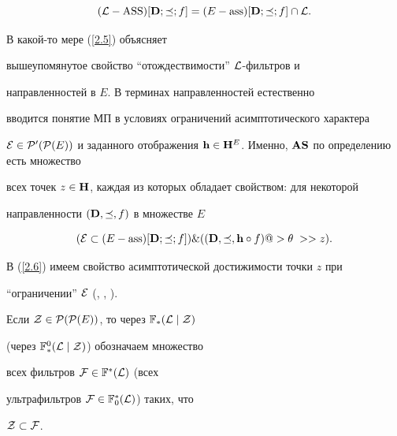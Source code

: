\begin{equation} \label{2.5}


({\cal L}-\ASS)[{\bold D};\preceq;f] = (E-\ass)[{\bold


D};\preceq;f]\cap{\cal L}.


\end{equation}


В какой-то мере (\ref{2.5}) объясняет


вышеупомянутое свойство ``отождествимости'' ${\cal L}$-фильтров и


направленностей в $E$. В терминах направленностей естественно


вводится понятие МП в условиях ограничений асимптотического характера


${\cal E} \in {\cal P}'({\cal P}(E))$ и заданного отображения ${\bold


h} \in {\bold H}^E$. Именно, ${\bold A}{\bold S}$ по определению есть множество 


всех точек $z \in {\bold H}$, каждая из которых обладает свойством: для некоторой


направленности $({\bold D},\preceq,f)$ в множестве $E$


\begin{equation} \label{2.6}


({\cal E} \subset (E-\ass)[{\bold D};\preceq;f]) \& (({\bold


D},\preceq,{\bold h}\circ{f}) @>{\theta\;}>> z).


\end{equation}


В (\ref{2.6}) имеем свойство асимптотической достижимости точки $z$ при


``ограничении'' ${\cal E}$ (\cite{2}, \cite{5}, \cite{6}).





Если ${\cal Z} \in


{\cal P}({\cal P}(E))$, то через ${{\Bbb F}_*}({\cal L}\mid{\cal Z})$


(через ${{\Bbb F}_*^0}({\cal L}\mid{\cal Z})$) обозначаем множество


всех фильтров ${\cal F} \in {{\Bbb F}^*}({\cal L})$ (всех


ультрафильтров ${\cal F} \in {{\Bbb F}_0^*}({\cal L})$) таких, что


${\cal Z} \subset {\cal F}$.








